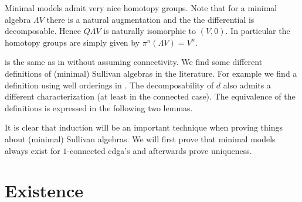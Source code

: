 Minimal models admit very nice homotopy groups. Note that for a minimal algebra $\Lambda V$ there is a natural augmentation and the the differential is decomposable. Hence $Q \Lambda V$ is naturally isomorphic to $(V, 0)$. In particular the homotopy groups are simply given by $\pi^n(\Lambda V) = V^n$.

 is the same as in \cite{felix} without assuming connectivity. We find some different definitions of (minimal) Sullivan algebras in the literature. For example we find a definition using well orderings in \cite{hess}. The decomposability of $d$ also admits a different characterization (at least in the connected case). The equivalence of the definitions is expressed in the following two lemmas.



It is clear that induction will be an important technique when proving things about (minimal) Sullivan algebras. We will first prove that minimal models always exist for $1$-connected cdga's and afterwards prove uniqueness.

\section{Existence}

